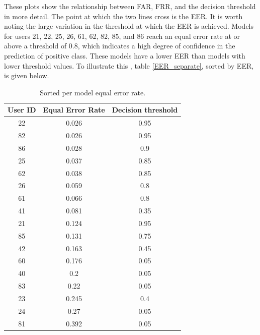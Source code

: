 These plots show the relationship between FAR, FRR, and the decision threshold in more detail. The point at which the two lines cross is the EER. It is worth noting the large variation in the threshold at which the EER is achieved. Models for users 21, 22, 25, 26, 61, 62, 82, 85, and 86 reach an equal error rate at or above a threshold of 0.8, which indicates a high degree of confidence in the prediction of positive class. These models have a lower EER than models with lower threshold values. To illustrate this , table \ref{EER_separate}, sorted by EER, is given below.

\begin{center}
	\begin{table}[H]
		\begin{center}
			\begin{tabular}{ |c|c|c| } 
				\hline
				User ID & Equal Error Rate & Decision threshold \\
				\hline
				\hline
				22 & 0.026 & 0.95 \\
				\hline
				82 & 0.026 & 0.95 \\
				\hline
				86 & 0.028 & 0.9 \\
				\hline
				25 & 0.037 & 0.85 \\
				\hline
				62 & 0.038 & 0.85 \\
				\hline
				26 & 0.059 & 0.8 \\
				\hline
				61 & 0.066 & 0.8 \\
				\hline
				41 & 0.081 & 0.35 \\
				\hline
				21 & 0.124 & 0.95 \\
				\hline
				85 & 0.131 & 0.75 \\
				\hline
				42 & 0.163 & 0.45 \\
				\hline
				60 & 0.176 & 0.05 \\
				\hline
				40 & 0.2 & 0.05 \\
				\hline
				83 & 0.22 & 0.05 \\
				\hline
				23 & 0.245 & 0.4 \\
				\hline
				24 & 0.27 & 0.05 \\
				\hline
				81 & 0.392 & 0.05 \\
				\hline
			\end{tabular}
		\end{center}
		\caption{Sorted per model equal error rate.}
		\label{table:EER_separate_sorted}
	\end{table}
\end{center}

